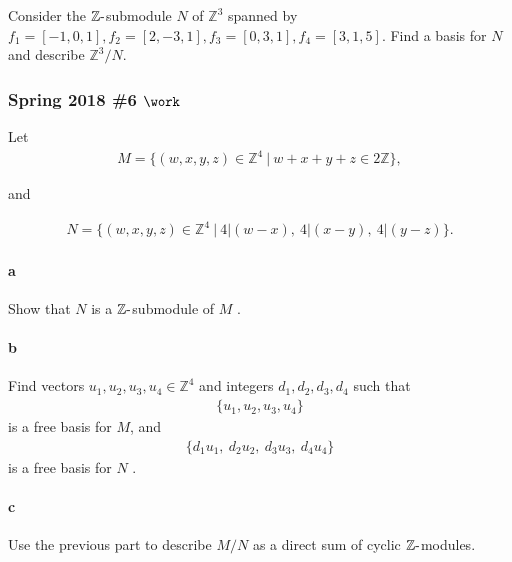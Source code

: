 Consider the \({\mathbb{Z}}{\hbox{-}}\)submodule \(N\) of
\({\mathbb{Z}}^3\) spanned by
\(f_1 = [-1, 0, 1], f_2 = [2,-3,1], f_3 = [0, 3, 1], f_4 = [3,1,5]\).
Find a basis for \(N\) and describe \({\mathbb{Z}}^3/N\).

\hypertarget{spring-2018-6-work}{%
\subsubsection{\texorpdfstring{Spring 2018 \#6
\(\work\)}{Spring 2018 \#6 \textbackslash work}}\label{spring-2018-6-work}}

Let
\begin{align*}
M = \{(w, x, y, z) \in {\mathbb{Z}}^4 {~\mathrel{\Big|}~}w + x + y + z \in 2{\mathbb{Z}}\}
,\end{align*}

and

\begin{align*}
N = \{(w, x, y, z) \in {\mathbb{Z}}^4 {~\mathrel{\Big|}~}4\mathrel{\Big|}(w - x),~ 4\mathrel{\Big|}(x - y),~ 4\mathrel{\Big|}( y - z)\}
.\end{align*}

\hypertarget{a-85}{%
\paragraph{a}\label{a-85}}

Show that \(N\) is a \({\mathbb{Z}}{\hbox{-}}\)submodule of \(M\) .

\hypertarget{b-75}{%
\paragraph{b}\label{b-75}}

Find vectors \(u_1 , u_2 , u_3 , u_4 \in {\mathbb{Z}}^4\) and integers
\(d_1 , d_2 , d_3 , d_4\) such that
\begin{align*}
\{u_1 , u_2 , u_3 , u_4 \}
\end{align*}
is a free basis for \(M\), and
\begin{align*}
\{d_1 u_1,~ d_2 u_2,~ d_3 u_3,~ d_4 u_4 \}
\end{align*}
is a free basis for \(N\) .

\hypertarget{c-49}{%
\paragraph{c}\label{c-49}}

Use the previous part to describe \(M/N\) as a direct sum of cyclic
\({\mathbb{Z}}{\hbox{-}}\)modules.

